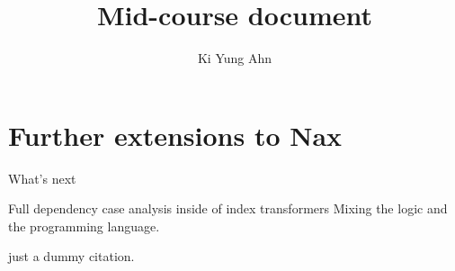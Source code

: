 \documentclass[letterpaper,12pt]{article}
\title{Mid-course document}
\author{Ki Yung Ahn}
\begin{document}
\maketitle














\section{Further extensions to Nax}\label{sec:ext}
What's next


Full dependency
case analysis inside of index transformers
Mixing the logic and the programming language.


\cite{bgb} just a dummy citation.

% 

\end{document}
